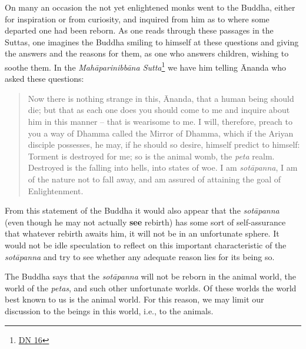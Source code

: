 On many an occasion the not yet enlightened monks went to the Buddha, either for inspiration or from curiosity, and inquired from him as to where some departed one had been reborn. As one reads through these passages in the Suttas, one imagines the Buddha smiling to himself at these questions and giving the answers and the reasons for them, as one who answers children, wishing to soothe them. In the \emph{Mahāparinibbāna Sutta}\footnote{\href{https://suttacentral.net/dn16/en/bodhi}{DN 16}} we have him telling Ānanda who asked these questions:

\begin{quote}
Now there is nothing strange in this, Ānanda, that a human being should die; but that as each one does you should come to me and inquire about him in this manner -- that is wearisome to me. I will, therefore, preach to you a way of Dhamma called the Mirror of Dhamma, which if the Ariyan disciple possesses, he may, if he should so desire, himself predict to himself: Torment is destroyed for me; so is the animal womb, the \emph{peta} realm. Destroyed is the falling into hells, into states of woe. I am \emph{sotāpanna}, I am of the nature not to fall away, and am assured of attaining the goal of Enlightenment.
\end{quote}

From this statement of the Buddha it would also appear that the \emph{sotāpanna} (even though he may not actually \textbf{see} rebirth) has some sort of self-assurance that whatever rebirth awaits him, it will not be in an unfortunate sphere. It would not be idle speculation to reflect on this important characteristic of the \emph{sotāpanna} and try to see whether any adequate reason lies for its being so.

The Buddha says that the \emph{sotāpanna} will not be reborn in the animal world, the world of the \emph{petas}, and such other unfortunate worlds. Of these worlds the world best known to us is the animal world. For this reason, we may limit our discussion to the beings in this world, i.e., to the animals.


